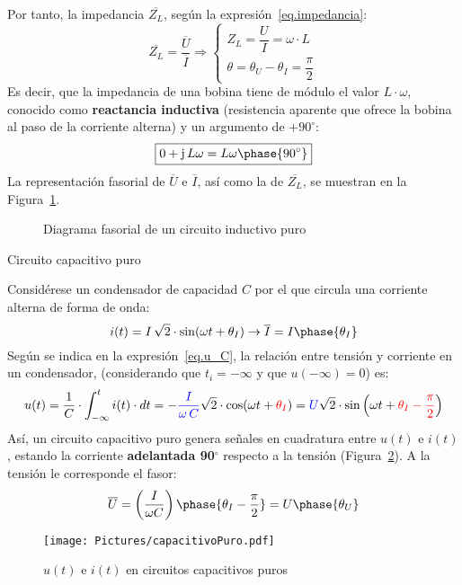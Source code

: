 \documentclass[11pt]{book} %
\makeatletter
\numberwithin{dummy}{section}
\theoremstyle{ocrenumbox}
\theoremstyle{blacknumex}
\theoremstyle{blacknumbox}
\theoremstyle{ocrenum}
\renewcommand{\subsection}{\@startsection {subsection}{2}{\z@}
{-3ex \@plus -0.1ex \@minus -.4ex}
{0.5ex \@plus.2ex }
{\normalfont\sffamily\bfseries}}
\newlength\esp
\makeatother
\begin{document}
	Por tanto, la impedancia $\overline{Z_L}$, según la expresión~\eqref{eq.impedancia}:
	\begin{equation*}
		\overline{Z_L}=\dfrac{\overline{U}}{\overline{I}}\Rightarrow
		\begin{cases}
			Z_L=\dfrac{U}{I}=\omega\cdot L\\
			\theta=\theta_U-\theta_I=\dfrac{\pi}{2}
		\end{cases}
	\end{equation*}
	Es decir, que la impedancia de una bobina tiene de módulo el valor $L\cdot\omega$, conocido como \textbf{reactancia inductiva} (resistencia aparente que ofrece la bobina al paso de la corriente alterna) y un argumento de $+90^\circ$:
	\begin{equation}
		\boxed{0+\mathrm{j}\,L\omega=L\omega\phase{90^\circ}}
	\end{equation}
	La representación fasorial de $\overline{U}$ e $\overline{I}$, así como la de $\overline{Z_L}$, se muestran en la Figura~\ref{fig.fasorInductancia}. 
	\begin{figure}[htbp]
		\centering
		\hfil
		\caption{Diagrama fasorial de un circuito inductivo puro}
		\label{fig.fasorInductancia}
	\end{figure}
	
	\subsection{Circuito capacitivo puro}\label{sec.C-puro}
	
	Considérese un condensador de capacidad $C$ por el que circula una corriente alterna de forma de onda:
	\begin{equation*}
		i(t)=I\,\sqrt{2}\cdot\sin(\omega t+\theta_I)\rightarrow\overline{I}=I\phase{\theta_I}
	\end{equation*}
	Según se indica en la expresión~\eqref{eq.u_C}, la relación entre tensión y corriente en un condensador, (considerando que $t_i=-\infty$ y que $u(-\infty)=0$) es: 
	\begin{equation*}
		u(t)=\dfrac{1}{C}\cdot\int_{-\infty}^{t} i(t)\cdot dt=-{\color{blue}\dfrac{I}{\omega\,C}}\sqrt{2}\cdot\cos (\omega t+{\color{red}\theta_I})={\color{blue}U}\sqrt{2}\cdot\sin \left(\omega t+{\color{red}\theta_I-\frac{\pi}{2}}\right)
	\end{equation*}
	Así, un circuito capacitivo puro genera señales en cuadratura entre $u(t)$ e $i(t)$, estando la corriente \textbf{adelantada 90$^\circ$} respecto a la tensión (Figura~\ref{fig.capacitivoPuro}). A la tensión le corresponde el fasor:
	\begin{equation*}
		\overline{U}=\left( \dfrac{I}{\omega C} \right)\phase{\theta_I-\frac{\pi}{2}}=U\phase{\theta_U}
	\end{equation*}
	\begin{figure}[htbp]
		\centering
		\texttt{[image: Pictures/capacitivoPuro.pdf]}
		\caption{$u(t)$ e $i(t)$ en circuitos capacitivos puros}
		\label{fig.capacitivoPuro}
	\end{figure}
	
\end{document}
